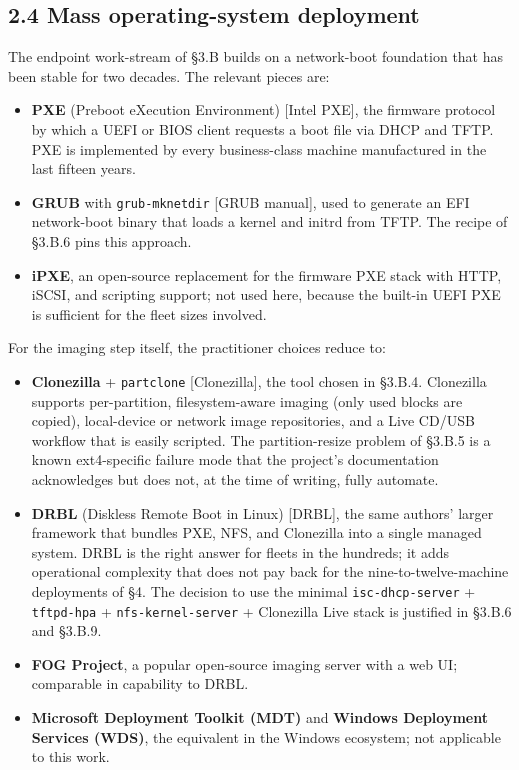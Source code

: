 \hypertarget{mass-operating-system-deployment}{%
\subsection{2.4 Mass operating-system
deployment}\label{mass-operating-system-deployment}}

The endpoint work-stream of §3.B builds on a network-boot foundation
that has been stable for two decades. The relevant pieces are:

\begin{itemize}
\tightlist
\item
  \textbf{PXE} (Preboot eXecution Environment) {[}Intel PXE{]}, the
  firmware protocol by which a UEFI or BIOS client requests a boot file
  via DHCP and TFTP. PXE is implemented by every business-class machine
  manufactured in the last fifteen years.
\item
  \textbf{GRUB} with \texttt{grub-mknetdir} {[}GRUB manual{]}, used to
  generate an EFI network-boot binary that loads a kernel and initrd
  from TFTP. The recipe of §3.B.6 pins this approach.
\item
  \textbf{iPXE}, an open-source replacement for the firmware PXE stack
  with HTTP, iSCSI, and scripting support; not used here, because the
  built-in UEFI PXE is sufficient for the fleet sizes involved.
\end{itemize}

For the imaging step itself, the practitioner choices reduce to:

\begin{itemize}
\tightlist
\item
  \textbf{Clonezilla} + \texttt{partclone} {[}Clonezilla{]}, the tool
  chosen in §3.B.4. Clonezilla supports per-partition, filesystem-aware
  imaging (only used blocks are copied), local-device or network image
  repositories, and a Live CD/USB workflow that is easily scripted. The
  partition-resize problem of §3.B.5 is a known ext4-specific failure
  mode that the project's documentation acknowledges but does not, at
  the time of writing, fully automate.
\item
  \textbf{DRBL} (Diskless Remote Boot in Linux) {[}DRBL{]}, the same
  authors' larger framework that bundles PXE, NFS, and Clonezilla into a
  single managed system. DRBL is the right answer for fleets in the
  hundreds; it adds operational complexity that does not pay back for
  the nine-to-twelve-machine deployments of §4. The decision to use the
  minimal \texttt{isc-dhcp-server} + \texttt{tftpd-hpa} +
  \texttt{nfs-kernel-server} + Clonezilla Live stack is justified in
  §3.B.6 and §3.B.9.
\item
  \textbf{FOG Project}, a popular open-source imaging server with a web
  UI; comparable in capability to DRBL.
\item
  \textbf{Microsoft Deployment Toolkit (MDT)} and \textbf{Windows
  Deployment Services (WDS)}, the equivalent in the Windows ecosystem;
  not applicable to this work.
\end{itemize}

